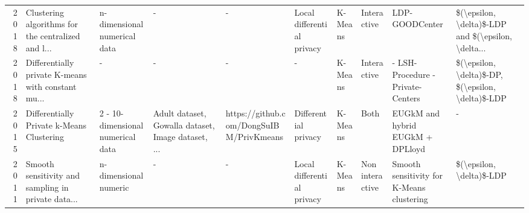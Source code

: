 \begin{landscape}
\begin{table}[ht]
\begin{adjustbox}{width=1.8\textwidth}
\begin{tabular}{rlllllllll}
        2018              & Clustering algorithms for the centralized and l...                                                            & n-dimensional numerical data         & -                                                  & -                                       & Local differential privacy & K-Means             & Interactive     & LDP-GOODCenter                            & \$(\textbackslash epsilon, \textbackslash delta)\$-LDP and \$(\textbackslash epsilon, \textbackslash delta... \\
        2018              & Differentially private K-means with constant mu...                                                            & -                                    & -                                                  & -                                       & -                          & K-Means             & Interactive     & - LSH-Procedure
        - Private-Centers & \$(\textbackslash epsilon, \textbackslash delta)\$-DP, \$(\textbackslash epsilon, \textbackslash delta)\$-LDP                                                                                                                                                                                                                                                                                                                                                                        \\
        2015              & Differentially Private k-Means Clustering                                                                     & 2 - 10-dimensional numerical data    & Adult dataset, Gowalla dataset, Image dataset, ... & https://github.com/DongSuIBM/PrivKmeans & Differential privacy       & K-Means             & Both            & EUGkM and hybrid EUGkM + DPLloyd          & -                                                                                                             \\
        2011              & Smooth sensitivity and sampling in private data...                                                            & n-dimensional numeric                & -                                                  & -                                       & Local differential privacy & K-Means             & Non interactive & Smooth sensitivity for K-Means clustering & \$(\textbackslash epsilon, \textbackslash delta)\$-LDP                                                        \\

\end{tabular}
\end{adjustbox}
\end{table}
\end{landscape}
